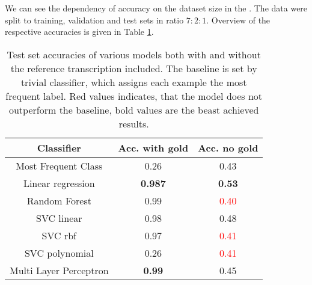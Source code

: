 We can see the dependency of accuracy on the dataset size in the .
The data were split to training, validation and test sets in ratio $7:2:1$.
Overview of the respective accuracies is given in Table \ref{tabacc}.
\begin{table}
\begin{center}
\begin{tabular}{ |c|c|c| } 
 \hline
 \textbf{Classifier} & \textbf{Acc. with gold} & \textbf{Acc. no gold} \\ \hline
 Most Frequent Class & 0.26 & 0.43 \\ \hline 
 Linear regression & \textbf{0.987} & \textbf{0.53} \\ \hline
 Random Forest & 0.99 & \textcolor{red}{0.40}\\ \hline
 SVC linear & 0.98 & 0.48 \\ \hline
 SVC rbf & 0.97 & \textcolor{red}{0.41} \\ \hline
 SVC polynomial & 0.26 & \textcolor{red}{0.41} \\ \hline
 Multi Layer Perceptron & \textbf{0.99} & 0.45 \\ \hline
 \end{tabular}
\end{center}
\label{tabacc}
\caption{Test set accuracies of various models both with and without the reference transcription included. The baseline is set by trivial classifier, which assigns each example the most frequent label. Red values indicates, that the model does not outperform the baseline, bold values are the beast achieved results.}
\end{table}
